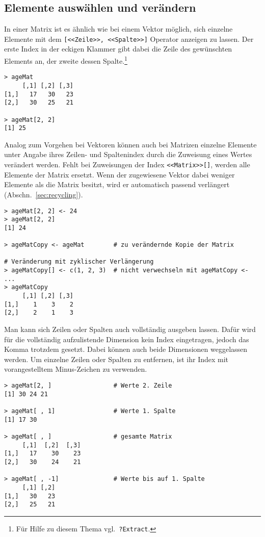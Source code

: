 \subsection{Elemente auswählen und verändern}

In einer Matrix ist es ähnlich wie bei einem Vektor möglich, sich einzelne Elemente mit dem \lstinline![<<Zeile>>, <<Spalte>>]! Operator anzeigen zu lassen. Der erste Index in der eckigen Klammer gibt dabei die Zeile des gewünschten Elements an, der zweite dessen Spalte.\footnote{Für Hilfe zu diesem Thema vgl.\ \lstinline!?Extract!.}
\begin{lstlisting}
> ageMat
     [,1] [,2] [,3]
[1,]   17   30   23
[2,]   30   25   21

> ageMat[2, 2]
[1] 25
\end{lstlisting}

Analog zum Vorgehen bei Vektoren können auch bei Matrizen einzelne Elemente unter Angabe ihres Zeilen- und Spaltenindex durch die Zuweisung eines Wertes verändert werden. Fehlt bei Zuweisungen der Index \lstinline!<<Matrix>>[]!, werden alle Elemente der Matrix ersetzt. Wenn der zugewiesene Vektor dabei weniger Elemente als die Matrix besitzt, wird er automatisch passend verlängert (Abschn.\ \ref{sec:recycling}).
\begin{lstlisting}
> ageMat[2, 2] <- 24
> ageMat[2, 2]
[1] 24

> ageMatCopy <- ageMat        # zu verändernde Kopie der Matrix

# Veränderung mit zyklischer Verlängerung
> ageMatCopy[] <- c(1, 2, 3)  # nicht verwechseln mit ageMatCopy <- ...
> ageMatCopy
     [,1] [,2] [,3]
[1,]    1    3    2
[2,]    2    1    3
\end{lstlisting}

Man kann sich Zeilen oder Spalten auch vollständig ausgeben lassen. Dafür wird für die vollständig aufzulistende Dimension kein Index eingetragen, jedoch das Komma trotzdem gesetzt. Dabei können auch beide Dimensionen weggelassen werden. Um einzelne Zeilen oder Spalten zu entfernen, ist ihr Index mit vorangestelltem Minus-Zeichen zu verwenden.
\begin{lstlisting}
> ageMat[2, ]                 # Werte 2. Zeile
[1] 30 24 21

> ageMat[ , 1]                # Werte 1. Spalte
[1] 17 30

> ageMat[ , ]                 # gesamte Matrix
     [,1]  [,2]  [,3]
[1,]   17    30    23
[2,]   30    24    21

> ageMat[ , -1]               # Werte bis auf 1. Spalte
     [,1] [,2]
[1,]   30   23
[2,]   25   21
\end{lstlisting}

